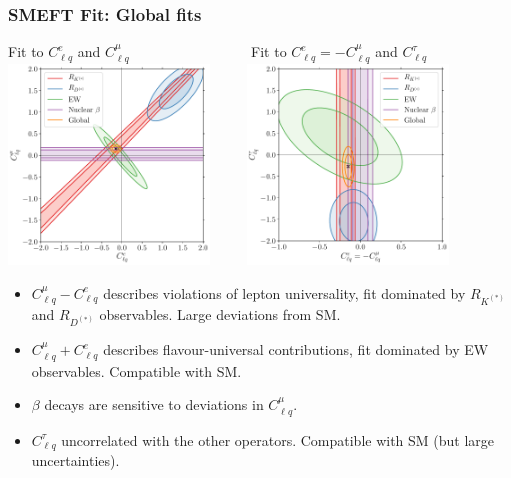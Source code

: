 \documentclass[mathserif, 10pt, dvipsnames]{beamer}
\begin{document}
\begin{frame}\frametitle{SMEFT Fit: Global fits}
    \begin{center}
{\footnotesize Fit to $C_{\ell q}^e$ and $C_{\ell q}^\mu$ $\qquad\qquad\qquad   \qquad$ Fit to $C_{\ell q}^e = -C_{\ell q}^\mu$ and $C_{\ell q}^\tau$}
        \includegraphics[width=0.4\textwidth]{figures/scIV_beta.pdf} $\qquad$
        \includegraphics[width=0.4\textwidth]{figures/scXI_beta.pdf}
    \end{center}
    \begin{itemize}
        \item $C_{\ell q}^\mu - C_{\ell q}^e$ describes violations of lepton universality, fit dominated by $R_{K^{(*)}}$ and $R_{D^{(*)}}$ observables. Large deviations from SM.
        \item $C_{\ell q}^\mu + C_{\ell q}^e$ describes flavour-universal contributions, fit dominated by EW observables. Compatible with SM.
        \item $\beta$ decays are sensitive to deviations in $C_{\ell q}^\mu$.
        \item $C_{\ell q}^\tau$ uncorrelated with the other operators. Compatible with SM (but large uncertainties).
    \end{itemize}

\end{frame}
\end{document}
